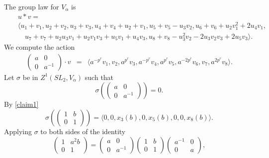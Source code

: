 \begin{example}
	The group law for $V_\alpha$ is
	\begin{eqnarray*}
		&&u * v =\\
		&&\langle
		u_1 + v_1,
		u_2 + v_2,
		u_3 + v_3,
		u_4 + v_4 + u_2 + v_1,
		u_5 + v_5 - u_3v_2,
		u_6 + v_6 + u_2v_1^2 + 2u_4v_1,\\
		&&\quad u_7 + v_7 + u_2u_3v_1 + u_2v_1v_3 + u_5v_1 + u_4v_3,
		u_8 + v_8 - u_3^2v_2 - 2u_3v_2v_3 + 2u_5v_3
		\rangle.
	\end{eqnarray*}
	We compute the action
	\begin{eqnarray*}
		\left(\begin{matrix} a & 0 \\ 0 & a^{-1} \end{matrix}\right)\cdot v
		&=&
		\langle 
		a^{-p^r}v_1,
		v_2,
		a^{p^r}v_3,
		a^{-p^r}v_4,
		a^{p^r}v_5,
		a^{-2p^r}v_6,
		v_7,
		a^{2p^r}v_8
		\rangle.
	\end{eqnarray*}
	Let $\sigma$ be in $Z^1(SL_2, V_\alpha)$ such that
	\begin{displaymath}
		\sigma\left(\left(\begin{matrix}a & 0\\0 & a^{-1}\end{matrix}\right)\right) = 0.
	\end{displaymath}
	By \ref{claim1}
	\begin{displaymath}
		\sigma\left(\left(\begin{matrix} 1 & b \\ 0 & 1 \end{matrix}\right)\right) =
		\langle 
		0,
		0,
		x_3(b),
		0,
		x_5(b),
		0,
		0,
		x_8(b)
		\rangle.
	\end{displaymath}
	Applying $\sigma$ to both sides of the identity
	\begin{displaymath}
		\left(\begin{matrix} 1 & a^2b \\ 0 & 1 \end{matrix}\right)
		= 
		\left(\begin{matrix} a & 0 \\ 0 & a^{-1} \end{matrix}\right)
		\left(\begin{matrix} 1 & b \\ 0 & 1 \end{matrix}\right)
		\left(\begin{matrix} a^{-1} & 0 \\ 0 & a \end{matrix}\right),
	\end{displaymath}

\end{example}
